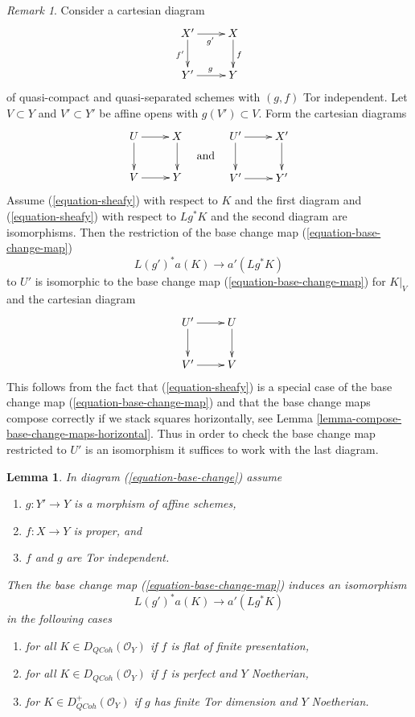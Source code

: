 \documentclass{stacks-project}
\theoremstyle{plain}
\newtheorem{lemma}[subsection]{Lemma}
\theoremstyle{definition}
\theoremstyle{remark}
\newtheorem{remark}[subsection]{Remark}
\numberwithin{equation}{subsection}
\def\QCoh{\mathit{QCoh}}
\begin{document}
\begin{remark}
\label{remark-check-over-affines}
Consider a cartesian diagram
$$
\xymatrix{
X' \ar[r]_{g'} \ar[d]_{f'} & X \ar[d]^f \\
Y' \ar[r]^g & Y
}
$$
of quasi-compact and quasi-separated schemes with $(g, f)$ Tor independent.
Let $V \subset Y$ and $V' \subset Y'$ be affine opens with
$g(V') \subset V$. Form the cartesian diagrams
$$
\vcenter{
\xymatrix{
U \ar[r] \ar[d] & X \ar[d] \\
V \ar[r] & Y
}
}
\quad\text{and}\quad
\vcenter{
\xymatrix{
U' \ar[r] \ar[d] & X' \ar[d] \\
V' \ar[r] & Y'
}
}
$$
Assume (\ref{equation-sheafy}) with respect to $K$
and the first diagram and (\ref{equation-sheafy})
with respect to $Lg^*K$ and the second diagram are isomorphisms.
Then the restriction of the base change map (\ref{equation-base-change-map})
$$
L(g')^*a(K) \longrightarrow a'(Lg^*K)
$$
to $U'$ is isomorphic to the base change map
(\ref{equation-base-change-map}) for $K|_V$ and the
cartesian diagram
$$
\xymatrix{
U' \ar[r] \ar[d] & U \ar[d] \\
V' \ar[r] & V
}
$$
This follows from the fact that (\ref{equation-sheafy})
is a special case of the base change map (\ref{equation-base-change-map})
and that the base change maps compose correctly if we stack squares
horizontally, see Lemma \ref{lemma-compose-base-change-maps-horizontal}.
Thus in order to check the base change map restricted to $U'$
is an isomorphism it suffices to work with the last diagram.
\end{remark}

\begin{lemma}
\label{lemma-more-base-change}
In diagram (\ref{equation-base-change}) assume
\begin{enumerate}
\item $g : Y' \to Y$ is a morphism of affine schemes,
\item $f : X \to Y$ is proper, and
\item $f$ and $g$ are Tor independent.
\end{enumerate}
Then the base change map (\ref{equation-base-change-map}) induces an
isomorphism
$$
L(g')^*a(K) \longrightarrow a'(Lg^*K)
$$
in the following cases
\begin{enumerate}
\item for all $K \in D_\QCoh(\mathcal{O}_Y)$ if $f$
is flat of finite presentation,
\item for all $K \in D_\QCoh(\mathcal{O}_Y)$ if $f$
is perfect and $Y$ Noetherian,
\item for $K \in D_\QCoh^+(\mathcal{O}_Y)$ if $g$ has finite Tor dimension
and $Y$ Noetherian.
\end{enumerate}
\end{lemma}
\end{document}

